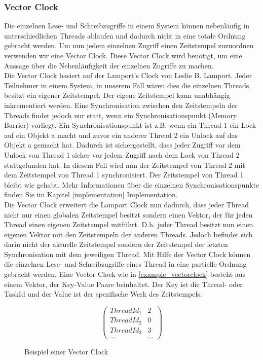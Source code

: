 \documentclass[10pt,a4paper]{article}
\begin{document}
\subsubsection{Vector Clock}
\begin{flushleft}
Die einzelnen Lese- und Schreibzugriffe in einem System können nebenläufig in unterschiedlichen Threads ablaufen und dadurch nicht in eine totale Ordnung gebracht werden. Um nun jedem einzelnen Zugriff einen Zeitstempel zuzuordnen verwenden wir eine Vector Clock. Diese Vector Clock wird benötigt, um eine Aussage über die Nebenläufigkeit der einzelnen Zugriffe zu machen.\\
Die Vector Clock basiert auf der Lamport's Clock von Leslie B. Lamport. Jeder Teilnehmer in einem System, in unserem Fall wären dies die einzelnen Threads, besitzt ein eigener Zeitstempel. Der eigene Zeitstempel kann unabhängig inkrementiert werden. Eine Synchronisation zwischen den Zeitstempeln der Threads findet jedoch nur statt, wenn ein Synchronisationspunkt (Memory Barrier) vorliegt. Ein Synchronisationspunkt ist z.B. wenn ein Thread 1 ein Lock auf ein Objekt a macht und zuvor ein anderer Thread 2 ein Unlock auf das Objekt a gemacht hat. Dadurch ist sichergestellt, dass jeder Zugriff vor dem Unlock von Thread 1 sicher vor jedem Zugriff nach dem Lock von Thread 2 stattgefunden hat. In diesem Fall wird nun der Zeitstempel von Thread 2 mit dem Zeitstempel von Thread 1 synchronisiert. Der Zeitstempel von Thread 1 bleibt wie gehabt. Mehr Informationen über die einzelnen Synchronisationspunkte finden Sie im Kapitel \ref{implementation} Implementation.\\
Die Vector Clock erweitert die Lamport Clock nun dadurch, dass jeder Thread nicht nur einen globalen Zeitstempel besitzt sondern einen Vektor, der für jeden Thread einen eigenen Zeitstempel mitführt. D.h. jeder Thread besitzt nun einen eigenen Vektor mit den Zeitstempeln der anderen Threads. Jedoch befindet sich darin nicht der aktuelle Zeitstempel sondern der Zeitstempel der letzten Synchronisation mit dem jeweiligen Thread. Mit Hilfe der Vector Clock können die einzelnen Lese- und Schreibzugriffe eines Thread in eine partielle Ordnung gebracht werden.
\newpage
Eine Vector Clock wie in \autoref{example_vectorclock} besteht aus einem Vektor, der Key-Value Paare beinhaltet. Der Key ist die Thread- oder TaskId und der Value ist der spezifische Werk des Zeitstempels.\\
\begin{figure}[H]
\[
	\begin{pmatrix}
		ThreadId_1 & 2\\
		ThreadId_2 & 0\\
		ThreadId_3 & 3\\
		... & ...
	\end{pmatrix}
\]
\caption{Beispiel einer Vector Clock}\label{example_vectorclock}
\end{figure}
\end{flushleft}
\end{document}
